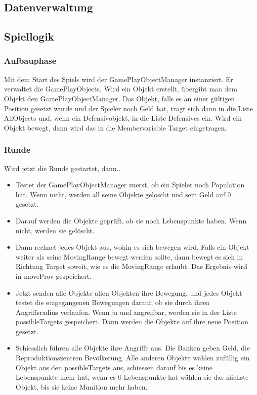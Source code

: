 \documentclass[ngerman, 12pt, pdftex]{scrartcl}[2006/07/30]
\begin{document}
\subsection{Datenverwaltung}


\subsection{Spiellogik}
\subsubsection{Aufbauphase}
Mit dem Start des Spiels wird der GamePlayObjectManager instanziert. Er verwaltet die GamePlayObjects.
Wird ein Objekt erstellt, \"{u}bergibt man dem Objekt den GamePlayObjectManager. Das Objekt, falls es an einer g\"{u}ltigen Position gesetzt wurde und der Spieler noch Geld hat, tr\"{a}gt sich dann in die Liste AllObjects und, wenn ein Defensivobjekt, in die Liste Defensives ein. Wird ein Objekt bewegt, dann wird das in die Membervariable Target eingetragen.

\subsubsection{Runde}

Wird jetzt die Runde gestartet, dann..
\begin{itemize}

\item Testet der GamePlayObjectManager zuerst, ob ein Spieler noch Population hat. Wenn nicht, werden all seine Objekte gel\"{o}scht und sein Geld auf 0 gesetzt.
\item Darauf werden die Objekte gepr\"{u}ft, ob sie noch Lebenspunkte haben. Wenn nicht, werden sie gel\"{o}scht.
\item Dann rechnet jedes Objekt aus, wohin es sich bewegen wird. Falls ein Objekt weiter als seine MovingRange bewegt werden sollte, dann bewegt es sich in Richtung Target soweit, wie es die MovingRange erlaubt. Das Ergebnis wird in moveProv gespeichert.
\item Jetzt senden alle Objekte allen Objekten ihre Bewegung, und jedes Objekt testet die eingegangenen Bewegungen darauf, ob sie durch ihren Angriffsradius verlaufen. Wenn ja und angreifbar, werden sie in der Liste possibleTargets gespeichert. Dann werden die Objekte auf ihre neue Position gesetzt.
\item Schiesslich f\"{u}hren alle Objekte ihre Angriffe aus. Die Banken geben Geld, die Reproduktionszentren Bev\"{o}lkerung. Alle anderen Objekte w\"{a}hlen zuf\"{u}llig ein Objekt aus den possibleTargets aus, schiessen darauf bis es keine Lebenspunkte mehr hat, wenn es 0 Lebenspunkte hat w\"{a}hlen sie das n\"{a}chste Objekt, bis sie keine Munition mehr haben.
\end{itemize}
\end{document}
